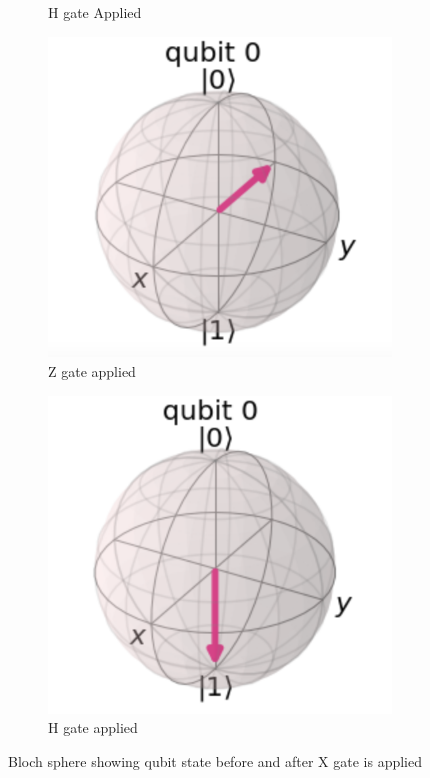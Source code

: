 \begin{figure}[h]
\begin{subfigure}[h]{0.24\textwidth}
        \caption{H gate Applied}
        \label{fig:hzhGate2}
    \end{subfigure}
        \begin{subfigure}[h]{0.24\textwidth}
        \centering
        \includegraphics[width=\textwidth]{lab2/images/hzhGate3.png}
        \caption{Z gate applied}
        \label{fig:hzhGate3}
    \end{subfigure}
        \begin{subfigure}[h]{0.24\textwidth}
        \centering
        \includegraphics[width=\textwidth]{lab2/images/hzhGate4.png}
        \caption{H gate applied}
        \label{fig:hzhGate4}
    \end{subfigure}
    \caption{Bloch sphere showing qubit state before and after X gate is applied} 
    \label{fig:bSphereHZHGate}
\end{figure}

